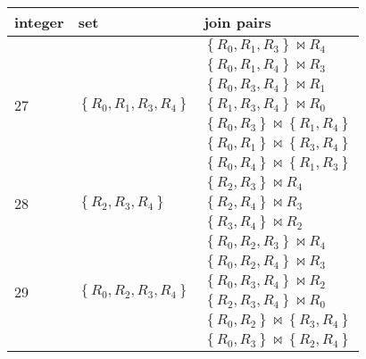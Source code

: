 \documentclass[12pt]{scrartcl}
\begin{document}
\begin{enumerate}
	\begin{table}[H]
		\begin{center}
			\begin{tabular}{lll}
				\hline
				integer &set & join pairs \\ \hline
				\multirow{7}{*}{27}	&\multirow{7}{*}{$\left\lbrace R_{0}, R_{1}, R_{3}, R_{4}\right\rbrace$}	& $\left\lbrace R_{0}, R_{1}, R_{3}\right\rbrace \bowtie R_{4}$ \\
									&																			& $\left\lbrace R_{0}, R_{1}, R_{4}\right\rbrace \bowtie R_{3}$ \\
									&																			& $\left\lbrace R_{0}, R_{3}, R_{4}\right\rbrace \bowtie R_{1}$ \\
									&																			& $\left\lbrace R_{1}, R_{3}, R_{4}\right\rbrace \bowtie R_{0}$ \\
									&																			& $\left\lbrace R_{0}, R_{3}\right\rbrace \bowtie \left\lbrace R_{1}, R_{4}\right\rbrace $ \\
									&																			& $\left\lbrace R_{0}, R_{1}\right\rbrace \bowtie \left\lbrace R_{3}, R_{4}\right\rbrace $ \\
									&																			& $\left\lbrace R_{0}, R_{4}\right\rbrace \bowtie \left\lbrace R_{1}, R_{3}\right\rbrace $ \\\hline
			\multirow{3}{*}{28}	&\multirow{3}{*}{$\left\lbrace R_{2}, R_{3}, R_{4}\right\rbrace$}			& $\left\lbrace R_{2}, R_{3}\right\rbrace \bowtie R_{4}$ \\
								&																	& $\left\lbrace R_{2}, R_{4}\right\rbrace \bowtie R_{3}$ \\
								&																	& $\left\lbrace R_{3}, R_{4}\right\rbrace \bowtie R_{2}$ \\ \hline
			\multirow{7}{*}{29}	&\multirow{7}{*}{$\left\lbrace R_{0}, R_{2}, R_{3}, R_{4}\right\rbrace$}	& $\left\lbrace R_{0}, R_{2}, R_{3}\right\rbrace \bowtie R_{4}$ \\
								&																			& $\left\lbrace R_{0}, R_{2}, R_{4}\right\rbrace \bowtie R_{3}$ \\
								&																			& $\left\lbrace R_{0}, R_{3}, R_{4}\right\rbrace \bowtie R_{2}$ \\
								&																			& $\left\lbrace R_{2}, R_{3}, R_{4}\right\rbrace \bowtie R_{0}$ \\
								&																			& $\left\lbrace R_{0}, R_{2}\right\rbrace \bowtie \left\lbrace R_{3}, R_{4}\right\rbrace $ \\
								&																			& $\left\lbrace R_{0}, R_{3}\right\rbrace \bowtie \left\lbrace R_{2}, R_{4}\right\rbrace $ \\

\end{tabular}
\end{center}
\end{table}
\end{enumerate}
\end{document}
